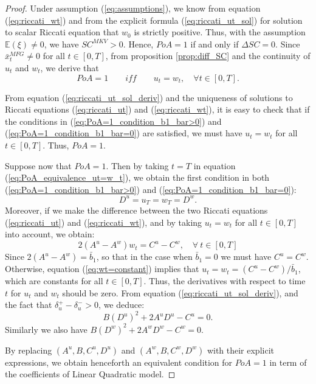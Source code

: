 \documentclass[11pt]{article}
\begin{document}
\begin{proof}
	Under assumption (\ref{eq:assumptions}), we know from equation (\ref{eq:riccati_wt}) and from the explicit formula (\ref{eq:riccati_ut_sol}) for solution to scalar Riccati equation that $w_0$ is strictly positive. Thus, with the assumption $\mathbb{E}(\xi) \neq 0$, we have $SC^{MKV} > 0$. Hence, $PoA =1$ if and only if $\Delta SC = 0$. Since $\bar{x}_t^{MFG} \neq 0$ for all $t \in [0,T]$, from proposition \ref{prop:diff_SC} and the continuity of $u_t$ and $w_t$, we derive that 
	\begin{equation}
		PoA = 1 \qquad iff \qquad u_t = w_t, \quad \forall  t \in [0,T].
	\label{eq:PoA_equivalence_ut=w_t} 
	\end{equation}
	
	From equation (\ref{eq:riccati_ut_sol_deriv}) and the uniqueness of solutions to Riccati equations (\ref{eq:riccati_ut}) and (\ref{eq:riccati_wt}), it is easy to check that if the conditions in (\ref{eq:PoA=1_condition_b1_bar>0}) and (\ref{eq:PoA=1_condition_b1_bar=0}) are satisfied, we must have $u_t = w_t$ for all $ t\in [0,T]$. Thus, $PoA = 1$.	
	
	Suppose now that $PoA =1$. Then by taking $t=T$ in equation (\ref{eq:PoA_equivalence_ut=w_t}), we obtain the first condition in both (\ref{eq:PoA=1_condition_b1_bar>0}) and (\ref{eq:PoA=1_condition_b1_bar=0}):
	$$D^u = u_T = w_T = D^w.$$
	Moreover, if we make the difference between the two Riccati equations (\ref{eq:riccati_ut}) and (\ref{eq:riccati_wt}), and by taking $u_t = w_t$ for all $t \in [0,T]$ into account, we obtain:
	\begin{equation}
		2 (A^u - A^w) w_t = C^u - C^w, \quad \forall \  t \in [0,T]
	\label{eq:wt=constant}
	\end{equation}
	Since $2(A^u - A^w) = \bar{b}_1$, so that in the case when $\bar{b}_1 =0$ we must have $C^u = C^w$. Otherwise, equation (\ref{eq:wt=constant}) implies that $u_t = w_t = (C^u - C^w) / \bar{b}_1 $, which are constants for all $t \in [0,T]$. Thus, the derivatives with respect to time $t$ for $u_t$ and $w_t$ should be zero. From equation (\ref{eq:riccati_ut_sol_deriv}), and the fact that $\delta_u^+ - \delta_u^- > 0$, we deduce: 
	$$ B (D^{u})^2 + 2 A^u D^u - C^u = 0.$$
	Similarly we also have $B (D^{w})^2 + 2 A^w D^w - C^w = 0$. 
	
	By replacing $(A^u,B, C^u, D^u)$ and $(A^w, B, C^w, D^w)$ with their explicit expressions, we obtain henceforth an equivalent condition for $PoA = 1$ in term of the coefficients of Linear Quadratic model.
	
\end{proof}
\end{document}
